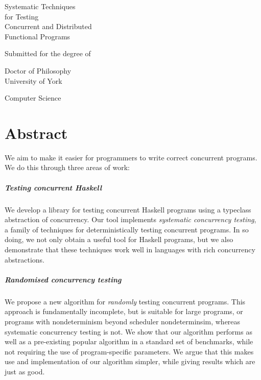 \begin{titlepage}
  \begin{center}
    \makeatletter

    {\fontsize{34pt}{36pt}\selectfont Systematic Techniques\\for Testing\\Concurrent and Distributed\\Functional Programs\par}

    \vspace{1.5cm}

    {\LARGE \@author}

    \vfill

    Submitted for the degree of\par
    Doctor of Philosophy\\[1.3cm]

    University of York\par
    Computer Science\\[1.3cm]

    \@date
    \makeatother
  \end{center}
\end{titlepage}

\chapter*{Abstract}

We aim to make it easier for programmers to write correct concurrent
programs.  We do this through three areas of work:

\paragraph{Testing concurrent Haskell}
We develop a library for testing concurrent Haskell programs using a
typeclass abstraction of concurrency.  Our tool implements
\emph{systematic concurrency testing}, a family of techniques for
deterministically testing concurrent programs.  In so doing, we not
only obtain a useful tool for Haskell programs, but we also
demonstrate that these techniques work well in languages with rich
concurrency abstractions.

\paragraph{Randomised concurrency testing}
We propose a new algorithm for \emph{randomly} testing concurrent
programs.  This approach is fundamentally incomplete, but is suitable
for large programs, or programs with nondeterminism beyond scheduler
nondeterminsim, whereas systematic concurrency testing is not.  We
show that our algorithm performs as well as a pre-existing popular
algorithm in a standard set of benchmarks, while not requiring the use
of program-specific parameters.  We argue that this makes use and
implementation of our algorithm simpler, while giving results which
are just as good.

